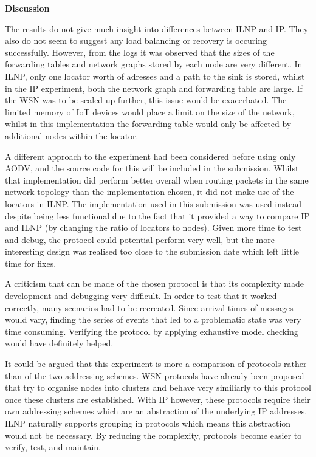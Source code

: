 \documentclass[12pt]{article}
\begin{document}
\medskip
\noindent\textbf{Discussion}

\noindent The results do not give much insight into differences between ILNP and IP. They also do not seem to suggest any load balancing or recovery is occuring successfully. However, from the logs it was observed that the sizes of the forwarding tables and network graphs stored by each node are very different. In ILNP, only one locator worth of adresses and a path to the sink is stored, whilst in the IP experiment, both the network graph and forwarding table are large. If the WSN was to be scaled up further, this issue would be exacerbated. The limited memory of IoT devices would place a limit on the size of the network, whilst in this implementation the forwarding table would only be affected by additional nodes within the locator. 

A different approach to the experiment had been considered before using only AODV, and the source code for this will be included in the submission. Whilst that implementation did perform better overall when routing packets in the same network topology than the implementation chosen, it did not make use of the locators in ILNP. The implementation used in this submission was used instead despite being less functional due to the fact that it provided a way to compare IP and ILNP (by changing the ratio of locators to nodes). Given more time to test and debug, the protocol could potential perform very well, but the more interesting design was realised too close to the submission date which left little time for fixes. 

A criticism that can be made of the chosen protocol is that its complexity made development and debugging very difficult. In order to test that it worked correctly, many scenarios had to be recreated. Since arrival times of messages would vary, finding the series of events that led to a problematic state was very time consuming. Verifying the protocol by applying exhaustive model checking would have definitely helped.

It could be argued that this experiment is more a comparison of protocols rather than of the two addressing schemes. WSN protocols have already been proposed that try to organise nodes into clusters and behave very similiarly to this protocol once these clusters are established. With IP however, these protocols require their own addressing schemes which are an abstraction of the underlying IP addresses. ILNP naturally supports grouping in protocols which means this abstraction would not be necessary. By reducing the complexity, protocols become easier to verify, test, and maintain. 
\end{document}

